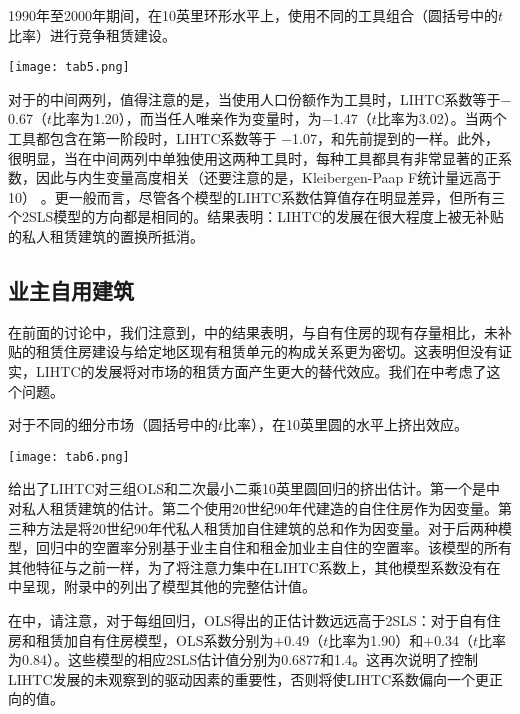 \documentclass[lang=cn,11pt,a4paper]{paper}
\begin{document}
\begin{table}[h]
  \caption{1990年至2000年期间，在10英里环形水平上，使用不同的工具组合（圆括号中的$t$比率）进行竞争租赁建设。}\label{tab5}
  \texttt{[image: tab5.png]}
\noindent{}
\end{table}

对于的中间两列，值得注意的是，当使用人口份额作为工具时，LIHTC系数等于$−$0.67（$t$比率为1.20），而当任人唯亲作为变量时，为$−$1.47（$t$比率为3.02）。当两个工具都包含在第一阶段时，LIHTC系数等于 $-$1.07，和先前提到的一样。此外，很明显，当在中间两列中单独使用这两种工具时，每种工具都具有非常显著的正系数，因此与内生变量高度相关（还要注意的是，Kleibergen-Paap F统计量远高于10） 。更一般而言，尽管各个模型的LIHTC系数估算值存在明显差异，但所有三个2SLS模型的方向都是相同的。结果表明：LIHTC的发展在很大程度上被无补贴的私人租赁建筑的置换所抵消。

\subsection{业主自用建筑}

在前面的讨论中，我们注意到，中的结果表明，与自有住房的现有存量相比，未补贴的租赁住房建设与给定地区现有租赁单元的构成关系更为密切。这表明但没有证实，LIHTC的发展将对市场的租赁方面产生更大的替代效应。我们在中考虑了这个问题。

\begin{table}[h]
  \caption{对于不同的细分市场（圆括号中的$t$比率），在10英里圆的水平上挤出效应。}\label{tab6}
  \texttt{[image: tab6.png]}
\noindent{}
\end{table}

给出了LIHTC对三组OLS和二次最小二乘10英里圆回归的挤出估计。第一个是中对私人租赁建筑的估计。第二个使用20世纪90年代建造的自住住房作为因变量。第三种方法是将20世纪90年代私人租赁加自住建筑的总和作为因变量。对于后两种模型，回归中的空置率分别基于业主自住和租金加业主自住的空置率。该模型的所有其他特征与之前一样，为了将注意力集中在LIHTC系数上，其他模型系数没有在中呈现，附录中的列出了模型其他的完整估计值。

在中，请注意，对于每组回归，OLS得出的正估计数远远高于2SLS：对于自有住房和租赁加自有住房模型，OLS系数分别为$+$0.49（$t$比率为1.90）和$+$0.34（$t$比率为0.84）。这些模型的相应2SLS估计值分别为0.6877和1.4。这再次说明了控制LIHTC发展的未观察到的驱动因素的重要性，否则将使LIHTC系数偏向一个更正向的值。
\end{document}
